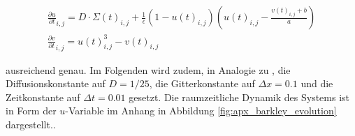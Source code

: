 \begin{equation}
\begin{gathered}
\frac{\partial u}{\partial t}_{i,j} = D \cdot \Sigma(t)_{i,j} + \frac{1}{\epsilon} (1-u(t)_{i,j}) \left(u(t)_{i,j}-\frac{v(t)_{i,j}+b}{a}\right)\\
\frac{\partial v}{\partial t}_{i,j} = u(t)_{i,j}^3-v(t)_{i,j}
\end{gathered}
\end{equation}

ausreichend genau. Im Folgenden wird zudem, in Analogie zu \citep{berg2011synchronization}, die Diffusionskonstante auf $D = 1/25$, die Gitterkonstante auf $\Delta x = 0.1$ und die Zeitkonstante auf $\Delta t = 0.01$ gesetzt. Die raumzeitliche Dynamik des Systems ist in Form der $u$-Variable im Anhang in Abbildung \ref{fig:apx_barkley_evolution} dargestellt.. 